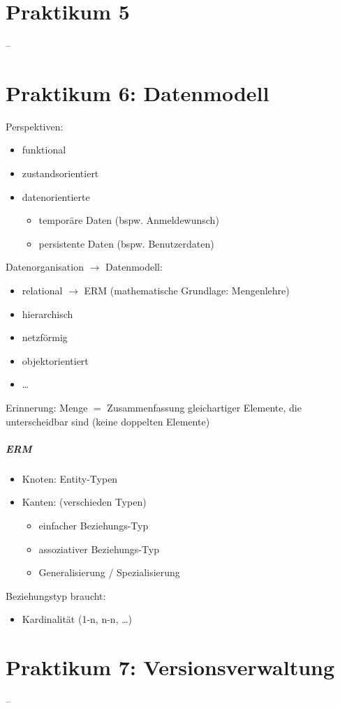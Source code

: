 \chapter{Praktikum 5}
--

\chapter{Praktikum 6: Datenmodell}
Perspektiven:
\begin{itemize}
\item funktional
\item zustandsorientiert
\item datenorientierte
\begin{itemize}
\item temporäre Daten (bspw. Anmeldewunsch)
\item persistente Daten (bspw. Benutzerdaten)
\end{itemize}
\end{itemize}
Datenorganisation $\to$ Datenmodell:
\begin{itemize}
\item relational $\to$ ERM (mathematische Grundlage: Mengenlehre)
\item hierarchisch
\item netzförmig
\item objektorientiert
\item …
\end{itemize}
Erinnerung: Menge $=$ Zusammenfassung gleichartiger Elemente, die unterscheidbar sind (keine doppelten Elemente)
\paragraph{ERM}
\begin{itemize}
\item Knoten: Entity-Typen
\item Kanten: (verschieden Typen)
\begin{itemize}
\item einfacher Beziehungs-Typ
\item assoziativer Beziehungs-Typ
\item Generalisierung / Spezialisierung
\end{itemize}
\end{itemize}
Beziehungstyp braucht: 
\begin{itemize}
\item Kardinalität (1-n, n-n, …)
\end{itemize}

\chapter{Praktikum 7: Versionsverwaltung}
--








